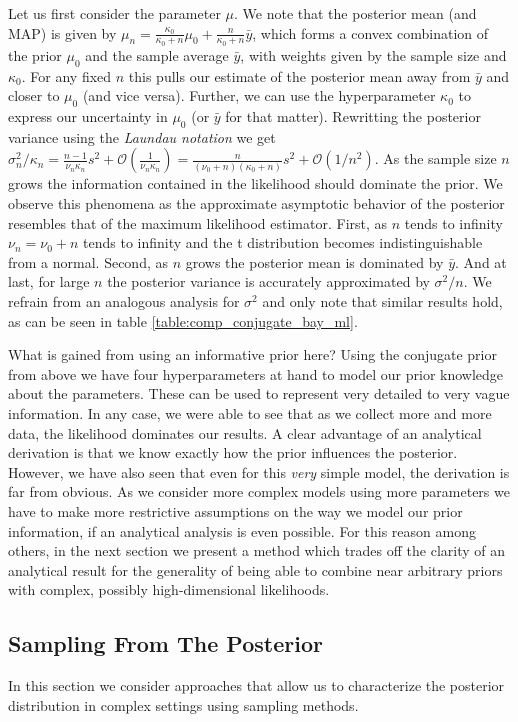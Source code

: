 Let us first consider the parameter $\mu$.
We note that the posterior mean (and MAP) is given by $\mu_n =\frac{\kappa_0}{\kappa_0 + n}\mu_0 + \frac{n}{\kappa_0 + n}\bar{y}$, which forms a convex combination of the prior $\mu_0$ and the sample average $\bar{y}$, with weights given by the sample size and $\kappa_0$.
For any fixed $n$ this pulls our estimate of the posterior mean away from $\bar{y}$ and closer to $\mu_0$ (and vice versa).
Further, we can use the hyperparameter $\kappa_0$ to express our uncertainty in $\mu_0$ (or $\bar{y}$ for that matter).
Rewritting the posterior variance using the \emph{Laundau notation} we get $\sigma_n^2 / \kappa_n = \frac{n-1}{\nu_n \kappa_n} s^2 + \mathcal{O}(\frac{1}{\nu_n\kappa_n}) = \frac{n}{(\nu_0 + n)(\kappa_0 + n)} s^2 + \mathcal{O}(1/n^2)$.
As the sample size $n$ grows the information contained in the likelihood should dominate the prior.
We observe this phenomena as the approximate asymptotic behavior of the posterior resembles that of the maximum likelihood estimator.
First, as $n$ tends to infinity $\nu_n = \nu_0 + n$ tends to infinity and the t distribution becomes indistinguishable from a normal.
Second, as $n$ grows the posterior mean is dominated by $\bar{y}$. And at last, for large $n$ the posterior variance is accurately approximated by $\sigma^2 / n$.
We refrain from an analogous analysis for $\sigma^2$ and only note that similar results hold, as can be seen in table \ref{table:comp_conjugate_bay_ml}.

What is gained from using an informative prior here?
Using the conjugate prior from above we have four hyperparameters at hand to model our prior knowledge about the parameters.
These can be used to represent very detailed to very vague information.
In any case, we were able to see that as we collect more and more data, the likelihood dominates our results.
A clear advantage of an analytical derivation is that we know exactly how the prior influences the posterior.
However, we have also seen that even for this \emph{very} simple model, the derivation is far from obvious.
As we consider more complex models using more parameters we have to make more restrictive assumptions on the way we model our prior information, if an analytical analysis is even possible.
For this reason among others, in the next section we present a method which trades off the clarity of an analytical result for the generality of being able to combine near arbitrary priors with complex, possibly high-dimensional likelihoods.


\newpage
\subsection{Sampling From The Posterior}
In this section we consider approaches that allow us to characterize the posterior distribution in complex settings using sampling methods.

